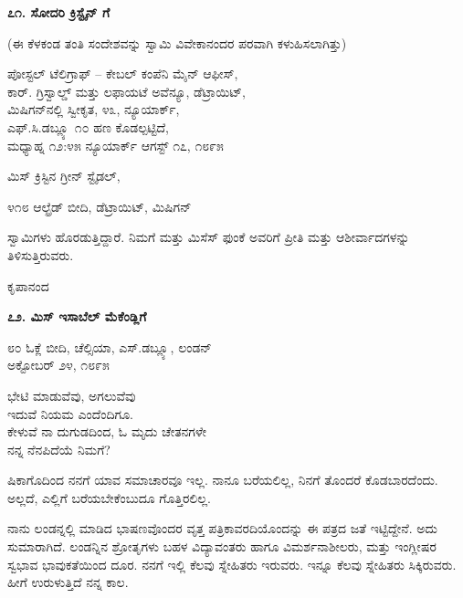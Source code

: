 \begin{center}
\textbf{೭೧. ಸೋದರಿ ಕ್ರಿಸ್ಟೈನ್ ಗೆ}
\end{center}

\begin{center}
(ಈ ಕೆಳಕಂಡ ತಂತಿ ಸಂದೇಶವನ್ನು ಸ್ವಾಮಿ ವಿವೇಕಾನಂದರ ಪರವಾಗಿ ಕಳುಹಿಸಲಾಗಿತ್ತು)
\end{center}

\begin{flushright}
ಪೋಸ್ಟಲ್ ಟೆಲಿಗ್ರಾಫ್ – ಕೇಬಲ್ ಕಂಪೆನಿ ಮೈನ್ ಆಫೀಸ್,\\ಕಾರ್. ಗ್ರಿಸ್ವಾಲ್ಡ್ ಮತ್ತು ಲಫಾಯಟೆ ಅವೆನ್ಯೂ, ಡೆಟ್ರಾಯಿಟ್,\\ಮಿಷಿಗನ್‌ನಲ್ಲಿ ಸ್ವೀಕೃತ, ೪೩, ನ್ಯೂಯಾರ್ಕ್,\\ಎಫ್.ಸಿ.ಡಬ್ಲ್ಯೂ ೧೦ ಹಣ ಕೊಡಲ್ಪಟ್ಟಿದೆ,\\ಮಧ್ಯಾಹ್ನ ೧೨:೪೫ ನ್ಯೂಯಾರ್ಕ್ ಆಗಸ್ಟ್ ೧೭, ೧೮೯೫
\end{flushright}

ಮಿಸ್ ಕ್ರಿಸ್ಟಿನ ಗ್ರೀನ್ ಸ್ಟೈಡಲ್,

೪೧೮ ಆಲ್ಫ್ರೆಡ್ ಬೀದಿ, ಡೆಟ್ರಾಯಿಟ್, ಮಿಷಿಗನ್

ಸ್ವಾಮಿಗಳು ಹೊರಡುತ್ತಿದ್ದಾರೆ. ನಿಮಗೆ ಮತ್ತು ಮಿಸೆಸ್ ಫುಂಕೆ ಅವರಿಗೆ ಪ್ರೀತಿ ಮತ್ತು ಆಶೀರ್ವಾದಗಳನ್ನು ತಿಳಿಸುತ್ತಿರುವರು.

\begin{flushright}
ಕೃಪಾನಂದ
\end{flushright}

\begin{center}
\textbf{೭೨. ಮಿಸ್ ಇಸಾಬೆಲ್ ಮೆಕೆಂಡ್ಲಿಗೆ}
\end{center}

\begin{flushright}
೮೦ ಓಕ್ಲೆ ಬೀದಿ, ಚೆಲ್ಸಿಯಾ, ಎಸ್.ಡಬ್ಲ್ಯೂ, ಲಂಡನ್\\ಅಕ್ಟೋಬರ್ ೨೪, ೧೮೯೫
\end{flushright}

\begin{myquote}
ಭೇಟಿ ಮಾಡುವೆವು, ಅಗಲುವೆವು\\ಇದುವೆ ನಿಯಮ ಎಂದೆಂದಿಗೂ.\\ಕೇಳುವೆ ನಾ ದುಗುಡದಿಂದ, ಓ ಮೃದು ಚೇತನಗಳೇ\\ನನ್ನ ನೆನಪಿದೆಯೆ ನಿಮಗೆ?
\end{myquote}

ಷಿಕಾಗೊದಿಂದ ನನಗೆ ಯಾವ ಸಮಾಚಾರವೂ ಇಲ್ಲ. ನಾನೂ ಬರೆಯಲಿಲ್ಲ, ನಿನಗೆ ತೊಂದರೆ ಕೊಡಬಾರದೆಂದು. ಅಲ್ಲದೆ, ಎಲ್ಲಿಗೆ ಬರೆಯಬೇಕೆಂಬುದೂ ಗೊತ್ತಿರಲಿಲ್ಲ.

ನಾನು ಲಂಡನ್ನಲ್ಲಿ ಮಾಡಿದ ಭಾಷಣವೊಂದರ ವೃತ್ತ ಪತ್ರಿಕಾವರದಿಯೊಂದನ್ನು ಈ ಪತ್ರದ ಜತೆ ಇಟ್ಟಿದ್ದೇನೆ. ಅದು ಸುಮಾರಾಗಿದೆ. ಲಂಡನ್ನಿನ ಶ್ರೋತೃಗಳು ಬಹಳ ವಿದ್ಯಾವಂತರು ಹಾಗೂ ವಿಮರ್ಶನಾಶೀಲರು, ಮತ್ತು ಇಂಗ್ಲೀಷರ ಸ್ವಭಾವ ಭಾವುಕತೆಯಿಂದ ದೂರ. ನನಗೆ ಇಲ್ಲಿ ಕೆಲವು ಸ್ನೇಹಿತರು ಇರುವರು. ಇನ್ನೂ ಕೆಲವು ಸ್ನೇಹಿತರು ಸಿಕ್ಕಿರುವರು. ಹೀಗೆ ಉರುಳುತ್ತಿದೆ ನನ್ನ ಕಾಲ.

